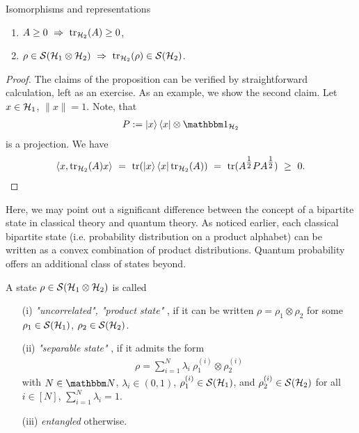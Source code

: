 \begin{subsection}{Isomorphisms and representations}
\begin{proposition}
\begin{enumerate}
   \item $A \geq 0 \ \Rightarrow \ \tr_{\cH_2}(A) \geq 0$,
   \item $\rho \in \cS(\cH_1 \otimes \cH_2) \ \Rightarrow \ \tr_{\cH_2}(\rho) \in \cS(\cH_2)$. 
  \end{enumerate}
 \end{proposition}
  \begin{proof}
   The claims of the proposition can be verified by straightforward calculation, left as an exercise. As an example, we show the second claim. Let $x \in {\mathcal H}_1$, $\|x\| =1$. Note, that 
   \begin{align*}
    P:= \ket{x}\bra{x} \otimes \bbmeins_{\cH_2}
   \end{align*}
   is a projection. We have
   \begin{align*}
    \braket{x, \mathrm{tr}_{{\mathcal H}_2}(A) x}  
    \ =\ \mathrm{tr}(\ket{x}\bra{x} \mathrm{tr}_{{\mathcal H}_2}(A)) 
    \ =\ \mathrm{tr}(A^{\tfrac{1}{2}}PA^{\tfrac{1}{2}}) 
    \ \geq\  0.
   \end{align*}
  \end{proof}
  Here, we may point out a significant difference between the concept of a bipartite state in classical theory and quantum theory. As noticed earlier, each classical bipartite state (i.e. probability distribution on a product alphabet) 
   can be written as a convex combination of product distributions. Quantum probability 
   offers an additional class of states beyond. 
  \begin{definition} \label{def:bipartite_state_classification}
   A state $\rho \in {\mathcal S}({\mathcal H}_1 \otimes {\mathcal H}_2)$ is called
   \begin{enumerate}
    \item[(i)] \emph{"uncorrelated", "product state"} , if it can be written $\rho = \rho_1 \otimes \rho_2$ for some $\rho_1 \in {\mathcal S}({\mathcal H}_1)$, $\rho_2 \in {\mathcal S}({\mathcal H}_2)$. 
    \item[(ii)] \emph{"separable state"} , if it admits the form 
    \begin{align*}
     \rho = \sum_{i=1}^N \lambda_i \ \rho_1^{(i)} \otimes \rho_2^{(i)}
    \end{align*}
    with $N \in \bbmN$, $\lambda_i \in (0,1)$, $\rho_1^{(i)} \in {\mathcal S}({\mathcal H}_1)$, and $\rho_2^{(i)} \in {\mathcal S}({\mathcal H}_2)$ for all $i \in [N]$, $\sum_{i=1}^N \lambda_i = 1$. 
    \item[(iii)] \emph{entangled}  otherwise.
   \end{enumerate}
  \end{definition}

\end{subsection}
